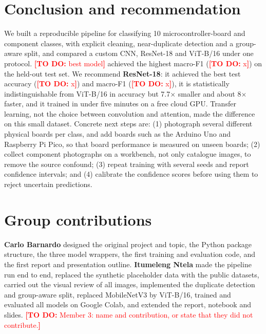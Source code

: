 \documentclass[11pt,a4paper]{article}
\newcommand{\fillin}[1]{\textcolor{red}{\textbf{[TO DO:} #1\textbf{]}}}
\providecommand{\NumClasses}{10}
\providecommand{\BestModel}{\fillin{best model}}
\providecommand{\BestMacroF}{\fillin{x}}
\providecommand{\AccResnet}{\fillin{x}}\providecommand{\MacroFResnet}{\fillin{x}}
\begin{document}
\section{Conclusion and recommendation}\label{sec:conclusion}
We built a reproducible pipeline for classifying \NumClasses{} microcontroller-board and component classes, with explicit cleaning, near-duplicate detection and a group-aware split, and compared a custom CNN, ResNet-18 and ViT-B/16 under one protocol. \BestModel{} achieved the highest macro-F1 (\BestMacroF) on the held-out test set. We recommend \textbf{ResNet-18}: it achieved the best test accuracy (\AccResnet) and macro-F1 (\MacroFResnet), it is statistically indistinguishable from ViT-B/16 in accuracy but 7.7$\times$ smaller and about 8$\times$ faster, and it trained in under five minutes on a free cloud GPU. Transfer learning, not the choice between convolution and attention, made the difference on this small dataset. Concrete next steps are: (1) photograph several different physical boards per class, and add boards such as the Arduino Uno and Raspberry Pi Pico, so that board performance is measured on unseen boards; (2) collect component photographs on a workbench, not only catalogue images, to remove the source confound; (3) repeat training with several seeds and report confidence intervals; and (4) calibrate the confidence scores before using them to reject uncertain predictions.

\section*{Group contributions}
\textbf{Carlo Barnardo} designed the original project and topic, the Python package structure, the three model wrappers, the first training and evaluation code, and the first report and presentation outline. \textbf{Itumeleng Ntela} made the pipeline run end to end, replaced the synthetic placeholder data with the public datasets, carried out the visual review of all images, implemented the duplicate detection and group-aware split, replaced MobileNetV3 by ViT-B/16, trained and evaluated all models on Google Colab, and extended the report, notebook and slides. \fillin{Member 3: name and contribution, or state that they did not contribute.}
\end{document}
